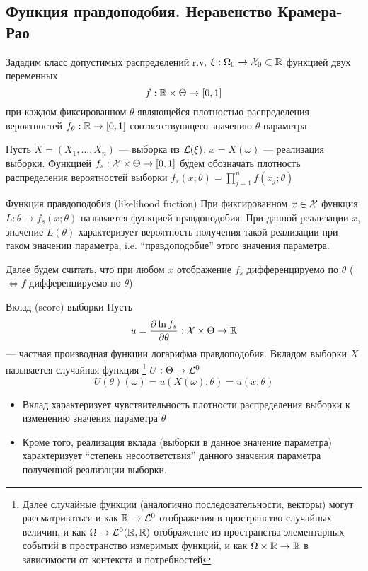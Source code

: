 \subsection{Функция правдоподобия. Неравенство {Крамера-Рао}}

Зададим класс допустимых распределений r.v. $\xi:\Omega_0\to\mathcal X_0\subset\mathbb R$
функцией двух переменных $$f: \mathbb R\times\Theta\to\left[{0, 1}\right]$$
при каждом фиксированном $\theta$ являющейся
плотностью распределения вероятностей $f_\theta: \mathbb R\to\left[{0, 1}\right]$
соответствующего значению $\theta$ параметра

Пусть $X = (X_1, \dotsc, X_n)$ --- выборка из $\mathcal L(\xi)$,
$x = X(\omega)$ --- реализация выборки.
Функцией $f_s:\mathcal X\times\Theta\to\left[{0, 1}\right]$
будем обозначать плотность распределения вероятностей выборки
$f_s(x; \theta) = \prod_{j=1}^n f(x_j; \theta)$

\begin{dfn}{Функция правдоподобия (likelihood fuction)}
При фиксированном $x\in\mathcal X$
функция $L: \theta\mapsto f_s(x;\theta)$ называется функцией правдоподобия.
При данной реализации $x$, значение $L(\theta)$ характеризует
вероятность получения такой реализации при таком значении параметра,
i.e. ``правдоподобие'' этого значения параметра.

Далее будем считать,
что при любом $x$
отображение $f_s$ дифференцируемо по $\theta$ ($\iff f$ дифференцируемо по $\theta$)
\end{dfn}

\begin{dfn}{Вклад (score) выборки}
Пусть $$u = \frac{\partial\ln f_s}{\partial\theta}:\mathcal X\times\Theta\to\mathbb R$$
--- частная производная функции логарифма правдоподобия.
Вкладом выборки $X$
называется случайная функция%
\footnote{Далее случайные функции (аналогично последовательности, векторы)
могут рассматриваться
и как $\mathbb R\to\mathcal L^{0}$ отображения в пространство случайных величин,
и как $\Omega\to\mathcal L^{0}(\mathbb R,\mathbb R)$
отображение из пространства элементарных событий в пространство измеримых функций,
и как $\Omega\times\mathbb R\to\mathbb R$
в зависимости от контекста и потребностей}
$U:\Theta\to\mathcal L^{0}$
$$U(\theta)(\omega) = u(X(\omega);\theta) = u(x;\theta)$$

\begin{itemize}
\item Вклад характеризует чувствительность плотности распределения выборки
к изменению значения параметра $\theta$
\item Кроме того, реализация вклада (выборки в данное значение параметра) характеризует
``степень несоответствия'' данного значения параметра полученной реализации выборки.
\end{itemize}
\end{dfn}


